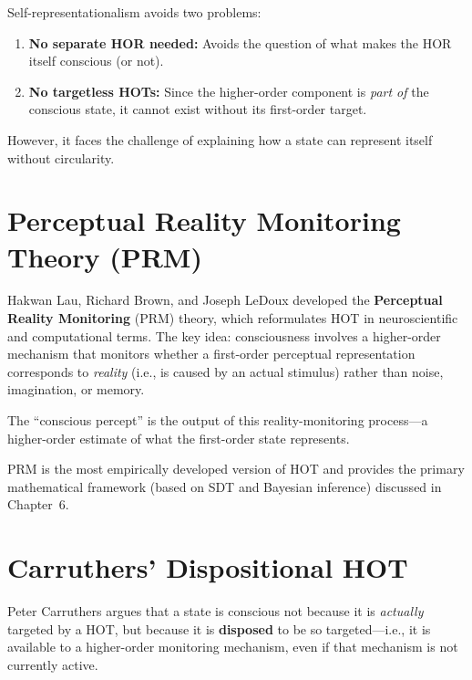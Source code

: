 \documentclass[11pt,a4paper]{report}
\begin{document}
Self-representationalism avoids two problems:
\begin{enumerate}[leftmargin=2em]
  \item \textbf{No separate HOR needed:} Avoids the question of what makes the HOR itself conscious (or not).
  \item \textbf{No targetless HOTs:} Since the higher-order component is \emph{part of} the conscious state, it cannot exist without its first-order target.
\end{enumerate}

However, it faces the challenge of explaining how a state can represent itself without circularity.

\section{Perceptual Reality Monitoring Theory (PRM)}

\begin{varbox}
Hakwan Lau, Richard Brown, and Joseph LeDoux developed the \textbf{Perceptual Reality Monitoring} (PRM) theory, which reformulates HOT in neuroscientific and computational terms. The key idea: consciousness involves a higher-order mechanism that monitors whether a first-order perceptual representation corresponds to \emph{reality} (i.e., is caused by an actual stimulus) rather than noise, imagination, or memory.

The ``conscious percept'' is the output of this reality-monitoring process---a higher-order estimate of what the first-order state represents.
\end{varbox}

PRM is the most empirically developed version of HOT and provides the primary mathematical framework (based on SDT and Bayesian inference) discussed in Chapter~6.

\section{Carruthers' Dispositional HOT}

\begin{varbox}
Peter Carruthers argues that a state is conscious not because it is \emph{actually} targeted by a HOT, but because it is \textbf{disposed} to be so targeted---i.e., it is available to a higher-order monitoring mechanism, even if that mechanism is not currently active.
\end{varbox}
\end{document}
